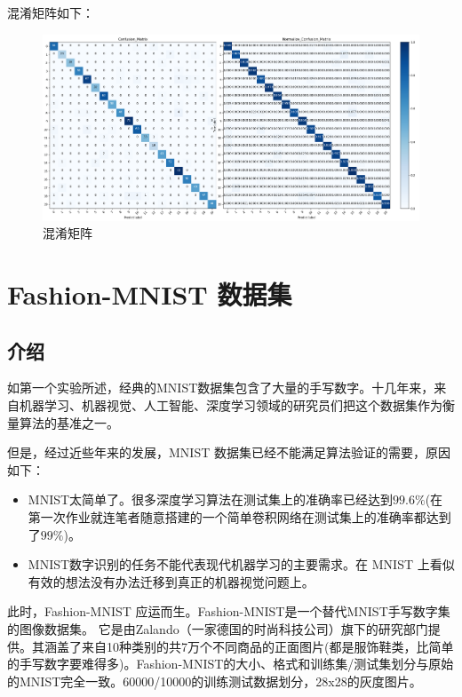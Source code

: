 \documentclass[12pt]{article}
\begin{document}
	混淆矩阵如下：
	
	\begin{figure}[H]
		\centering
		\includegraphics[width=4.6in]{./images/plane_noise_confusion.png}
		\centering
		\caption{混淆矩阵}
	\end{figure}
	
	
	
	\section{Fashion-MNIST 数据集}
	
	\subsection{介绍}
	
	如第一个实验所述，经典的MNIST数据集包含了大量的手写数字。十几年来，来自机器学习、机器视觉、人工智能、深度学习领域的研究员们把这个数据集作为衡量算法的基准之一。
	
	但是，经过近些年来的发展，MNIST 数据集已经不能满足算法验证的需要，原因如下：
	
	\begin{itemize}
		\item MNIST太简单了。很多深度学习算法在测试集上的准确率已经达到$99.6\%$(在第一次作业就连笔者随意搭建的一个简单卷积网络在测试集上的准确率都达到了$99\%$)。
		\item MNIST数字识别的任务不能代表现代机器学习的主要需求。在 MNIST 上看似有效的想法没有办法迁移到真正的机器视觉问题上。
	\end{itemize}
	
	此时，Fashion-MNIST 应运而生。Fashion-MNIST是一个替代MNIST手写数字集的图像数据集。 它是由Zalando（一家德国的时尚科技公司）旗下的研究部门提供。其涵盖了来自10种类别的共7万个不同商品的正面图片(都是服饰鞋类，比简单的手写数字要难得多)。Fashion-MNIST的大小、格式和训练集/测试集划分与原始的MNIST完全一致。60000/10000的训练测试数据划分，28x28的灰度图片。
	
\end{document}
